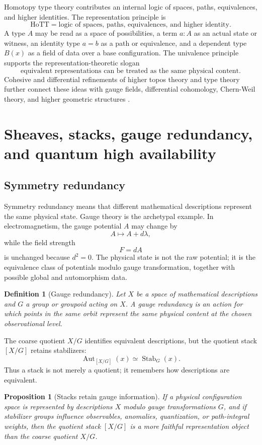 \documentclass[11pt]{article}
\newtheorem{definition}{Definition}[section]
\newtheorem{proposition}{Proposition}[section]
\newcommand{\Aut}{\operatorname{Aut}}
\begin{document}
Homotopy type theory contributes an internal logic of spaces, paths, equivalences, and higher identities. The representation principle is
\[
\boxed{\text{HoTT}=\text{logic of spaces, paths, equivalences, and higher identity}.}
\]
A type $A$ may be read as a space of possibilities, a term $a:A$ as an actual state or witness, an identity type $a=b$ as a path or equivalence, and a dependent type $B(x)$ as a field of data over a base configuration. The univalence principle supports the representation-theoretic slogan
\[
\boxed{\text{equivalent representations can be treated as the same physical content}.}
\]
Cohesive and differential refinements of higher topos theory and type theory further connect these ideas with gauge fields, differential cohomology, Chern-Weil theory, and higher geometric structures \cite{Schreiber2013}.

\section{Sheaves, stacks, gauge redundancy, and quantum high availability}

\subsection{Symmetry redundancy}

Symmetry redundancy means that different mathematical descriptions represent the same physical state. Gauge theory is the archetypal example. In electromagnetism, the gauge potential $A$ may change by
\[
A\mapsto A+d\lambda,
\]
while the field strength
\[
F=dA
\]
is unchanged because $d^2=0$. The physical state is not the raw potential; it is the equivalence class of potentials modulo gauge transformation, together with possible global and automorphism data.

\begin{definition}[Gauge redundancy]
Let $X$ be a space of mathematical descriptions and $G$ a group or groupoid acting on $X$. A \emph{gauge redundancy} is an action for which points in the same orbit represent the same physical content at the chosen observational level.
\end{definition}

The coarse quotient $X/G$ identifies equivalent descriptions, but the quotient stack $[X/G]$ retains stabilizers:
\[
\Aut_{[X/G]}(x)\simeq \operatorname{Stab}_G(x).
\]
Thus a stack is not merely a quotient; it remembers how descriptions are equivalent.

\begin{proposition}[Stacks retain gauge information]
If a physical configuration space is represented by descriptions $X$ modulo gauge transformations $G$, and if stabilizer groups influence observables, anomalies, quantization, or path-integral weights, then the quotient stack $[X/G]$ is a more faithful representation object than the coarse quotient $X/G$.
\end{proposition}
\end{document}
